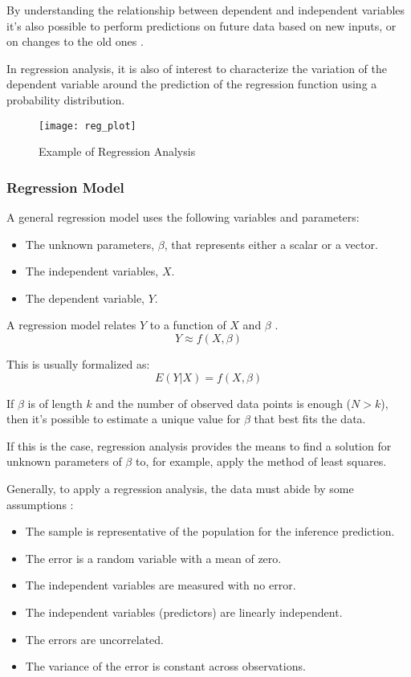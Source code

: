 By understanding the relationship between dependent and independent variables it's also possible to perform predictions on future data based on new inputs, or on changes to the old ones \cite{wiki:reg_an}.

In regression analysis, it is also of interest to characterize the variation of the dependent variable around the prediction of the regression function using a probability distribution.

\begin{figure}[H]
	\centering
	\texttt{[image: reg\_plot]}
	\caption{Example of Regression Analysis}
	\label{fig:reg_plot}
\end{figure}	

\subsubsection*{Regression Model} 
A general regression model uses the following variables and parameters:
\begin{itemize}[noitemsep]
	\item The unknown parameters, $\beta$, that represents either a scalar or a vector.
	\item The independent variables, $X$. 
	\item The dependent variable, $Y$.
\end{itemize}

A regression model relates $Y$ to a function of $X$ and $\beta$ \cite{wiki:reg_an}.
\begin{equation}
	Y \approx f(X,\beta)
\end{equation}

This is usually formalized as:
\begin{equation}
	E(Y|X) = f(X,\beta)
\end{equation}

If $\beta$ is of length $k$ and the number of observed data points is enough ($N > k$), then it's possible to estimate a unique value for $\beta$ that best fits the data.

If this is the case, regression analysis provides the means to find a solution for unknown parameters of $\beta$ to, for example, apply the method of least squares.

Generally, to apply a regression analysis, the data must abide by some assumptions \cite{wiki:lin_reg}:
\begin{itemize}[noitemsep, topsep = -5pt]
	\item The sample is representative of the population for the inference prediction.
	\item The error is a random variable with a mean of zero.
	\item The independent variables are measured with no error.
	\item The independent variables (predictors) are linearly independent.
	\item The errors are uncorrelated.
	\item The variance of the error is constant across observations.
\end{itemize}

